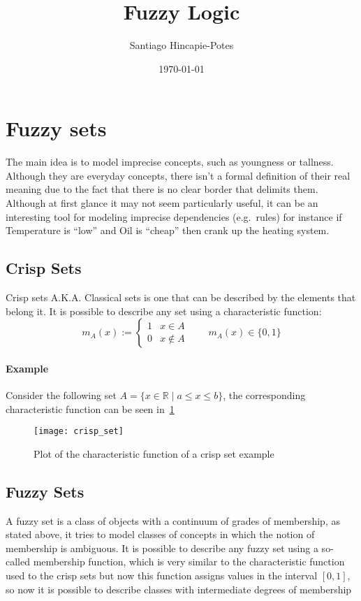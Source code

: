 \documentclass[]{article}
\title{Fuzzy Logic}
\author{Santiago Hincapie-Potes}
\date{\today}
\begin{document}
\maketitle


\section{Fuzzy sets}
The main idea is to model imprecise concepts, such as youngness or tallness.
Although they are everyday concepts, there isn't a formal definition of their
real meaning due to the fact that there is no clear border that delimits them.\\
Although at first glance it may not seem particularly useful, it can be an
interesting tool for modeling imprecise dependencies (e.g.\ rules) for instance
if Temperature is ``low'' and Oil is ``cheap'' then crank up the heating system.

\subsection{Crisp Sets}
Crisp sets A.K.A. Classical sets is one that can be described by the elements that
belong it. It is possible to describe any set using a characteristic function:
\[ m_{A}(x) := \begin{cases}
      1 & x\in A \\
      0 & x\notin A
   \end{cases} \qquad m_{A}(x) \in \{0, 1\}
\]
\paragraph{Example} Consider the following set
\( A = \{x \in \mathbb{R} \mid a \leq x \leq b \}\),
the corresponding characteristic function can be seen in~\ref{fig:crispset}

\begin{figure}[ht!]
  \centering
  \texttt{[image: crisp\_set]}
  \caption{Plot of the characteristic function of a crisp set example\label{fig:crispset}}
\end{figure}

\subsection{Fuzzy Sets~\citep{Zadeh1965}}
A fuzzy set is a class of objects with a continuum of grades of membership,
as stated above, it tries to model classes of concepts in which the notion of
membership is ambiguous. It is possible to describe any fuzzy set using a
so-called membership function, which is very similar to the characteristic
function used to the crisp sets but now this function assigns values in the
interval $[0, 1]$, so now it is possible to describe classes with intermediate
degrees of membership
\end{document}
